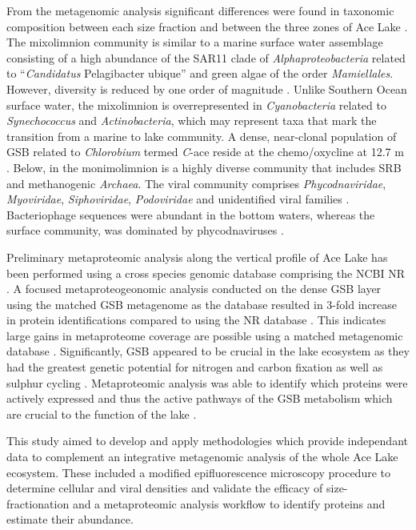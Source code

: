 From the metagenomic analysis significant differences were found in taxonomic composition between each size fraction and between the three zones of Ace Lake \cite{Lauro2011}.
The mixolimnion community is similar to a marine surface water assemblage consisting of a high abundance of the SAR11 clade of \emph{Alphaproteobacteria} related to ``\emph{Candidatus} Pelagibacter ubique'' and green algae of the order \emph{Mamiellales}.
However, diversity is reduced by one order of magnitude \cite{Lauro2011}.
Unlike Southern Ocean surface water, the mixolimnion is overrepresented in \emph{Cyanobacteria} related to \emph{Synechococcus} and \emph{Actinobacteria}, which may represent taxa that mark the transition from a marine to lake community.
A dense, near-clonal population of \acl{GSB} related to \emph{Chlorobium} termed \emph{C}-ace reside at the chemo/oxycline at 12.7 m \cite{Ng2010a, Lauro2011}.
Below, in the monimolimnion is a highly diverse community that includes \ac{SRB} and methanogenic \emph{Archaea}.
The viral community comprises \emph{Phycodnaviridae}, \emph{Myoviridae}, \emph{Siphoviridae}, \emph{Podoviridae} and unidentified viral families \cite{Lauro2011}. 
Bacteriophage sequences were abundant in the bottom waters, whereas the surface community, was dominated by phycodnaviruses \cite{Lauro2011}. 

Preliminary metaproteomic analysis along the vertical profile of Ace Lake has been performed using a cross species genomic database comprising the \ac{NCBI} \ac{NR} \cite{Ng2010b}.
A focused metaproteogeonomic analysis conducted on the dense \ac{GSB} layer using the matched \ac{GSB} metagenome as the database resulted in 3-fold increase in protein identifications compared to using the \ac{NR} database \cite{Ng2010b}.
This indicates large gains in metaproteome coverage are possible using a matched metagenomic database \cite{Ng2010b}.
Significantly, \ac{GSB} appeared to be crucial in the lake ecosystem as they had the greatest genetic potential for nitrogen and carbon fixation as well as sulphur cycling \cite{Ng2010b, Lauro2011}.
Metaproteomic analysis was able to identify which proteins were actively expressed and thus the active pathways of the \ac{GSB} metabolism which are crucial to the function of the lake \cite{Ng2010a}.

This study aimed to develop and apply methodologies which provide independant data to complement an integrative metagenomic analysis of the whole Ace Lake ecosystem.
These included a modified epifluorescence microscopy procedure to determine cellular and viral densities and validate the efficacy of size-fractionation and a metaproteomic analysis workflow to identify proteins and estimate their abundance.

